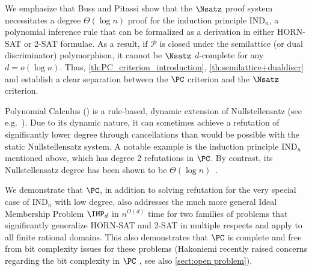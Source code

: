 \documentclass[11pt]{article}
\begin{document}
We emphasize that Buss and Pitassi \cite{BussP98} 
show that the \(\Nsatz\) proof system necessitates a degree \(\Theta(\log n)\) proof for the induction principle \(\text{IND}_n\), a polynomial inference rule that can be formalized as a derivation in either \textsc{HORN-SAT} or \textsc{2-SAT} formulae. As a result, if \(\mathcal{P}\) is closed under the semilattice (or dual discriminator) polymorphism, it cannot be \(\Nsatz\) \(d\)-complete for any \(d = o(\log n)\).
%
Thus, \cref{th:PC_criterion_introduction}, \cref{th:semilattice+dualdiscr} and \cite{BussP98} establish a clear separation between the $\PC$ criterion and the \(\Nsatz\) criterion. %

    Polynomial Calculus (\PC) is a rule-based, dynamic extension of Nullstellensatz (see e.g.~\cite{FlemingKothariPitassi19}). Due to its dynamic nature, it can sometimes achieve a refutation of significantly lower degree through cancellations than would be possible with the static Nullstellensatz system. A notable example is the induction principle \(\text{IND}_n\) mentioned above, which has degree 2 refutations in $\PC$. By contrast, its Nullstellensatz degree has been shown to be \(\Theta(\log n)\)~\cite{BussP98}.

    We demonstrate that $\PC$, in addition to solving refutation for the very special case of \(\text{IND}_n\) with low degree, also addresses the much more general Ideal Membership Problem $\IMP_d$ in $n^{O(d)}$ time for two families of problems that significantly generalize \textsc{HORN-SAT} and \textsc{2-SAT} in multiple respects and apply to all finite rational domains. This also demonstrates that \(\PC\) is complete and free from bit complexity issues for these problems (Hakoniemi recently raised concerns regarding the bit complexity in \(\PC\) \cite{Hakoniemi21}, see also \cref{sect:open problem}).  
    
\end{document}
